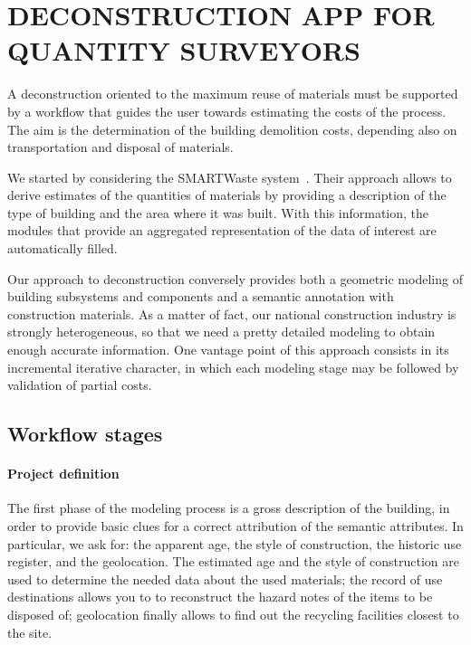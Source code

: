 \section{\uppercase{Deconstruction App for quantity surveyors}}
\label{sec:application}

A deconstruction oriented to the maximum reuse of materials must be supported by a workflow that guides the user towards estimating the costs of the process. The aim is the determination of the building demolition costs, depending also on transportation  and disposal of materials.

We started by considering the SMARTWaste system~\cite{smartWaste}. Their approach allows to derive estimates of the quantities of materials by providing a description of the type of building and the area where it was built. With this information, the modules that provide an aggregated representation of the data of interest are automatically filled.

Our approach to deconstruction conversely provides both a geometric modeling of building subsystems and components and a semantic annotation with construction materials. As a matter of fact, our national construction industry is strongly heterogeneous, so that  we need a pretty detailed modeling to obtain enough accurate information.
One vantage point of this approach consists in its incremental iterative character, in which each modeling stage may be followed by validation of partial costs.

\subsection{Workflow stages}

\paragraph{Project definition} 

The first phase of the modeling process is a gross description of the building, in order to provide basic clues for a correct attribution of the semantic attributes.
In particular, we ask for: the apparent age, the style of construction, the historic use register, and the geolocation.
The estimated age and the style of construction are used to determine the needed data about the used materials; the record of use destinations allows you to to reconstruct the hazard notes of the items to be disposed of; geolocation finally allows to find out the recycling facilities closest to the site.

